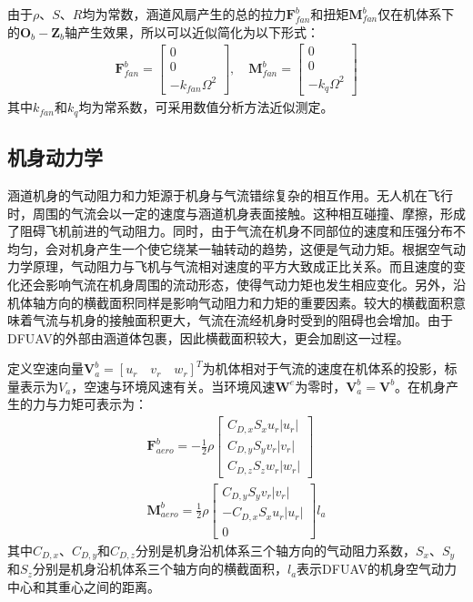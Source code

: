 由于$\rho$、$S$、$R$均为常数，涵道风扇产生的总的拉力$\boldsymbol{F}_{fan}^b$和扭矩$\boldsymbol{M}_{fan}^b$仅在机体系下的${\boldsymbol{O}_b}-{\boldsymbol{Z}_b}$轴产生效果，所以可以近似简化为以下形式\cite{choiStaticAnalysisSmall2012,manzoorCompositeObserverbasedRobust2023}：
\begin{align}
            \boldsymbol{F}_{fan}^b=\begin{bmatrix}0 \\ 0 \\
                -k_{fan}\Omega^2
            \end{bmatrix},\quad    
            \boldsymbol{M}_{fan}^b=\begin{bmatrix}0 \\ 0 \\
            -k_{q}\Omega^2
            \end{bmatrix}    \label{eq_22}
\end{align}
其中$k_{fan}$和$k_{q}$均为常系数，可采用数值分析方法近似测定。
\subsection{机身动力学}

涵道机身的气动阻力和力矩源于机身与气流错综复杂的相互作用。无人机在飞行时，周围的气流会以一定的速度与涵道机身表面接触。这种相互碰撞、摩擦，形成了阻碍飞机前进的气动阻力。同时，由于气流在机身不同部位的速度和压强分布不均匀，会对机身产生一个使它绕某一轴转动的趋势，这便是气动力矩。根据空气动力学原理，气动阻力与飞机与气流相对速度的平方大致成正比关系。而且速度的变化还会影响气流在机身周围的流动形态，使得气动力矩也发生相应变化。另外，沿机体轴方向的横截面积同样是影响气动阻力和力矩的重要因素。较大的横截面积意味着气流与机身的接触面积更大，气流在流经机身时受到的阻碍也会增加。由于DFUAV的外部由涵道体包裹，因此横截面积较大，更会加剧这一过程。

定义空速向量$\boldsymbol{V}_a^b= [ u_r \quad v_r \quad w_r ]^T$为机体相对于气流的速度在机体系的投影，标量表示为$V_a$，空速与环境风速有关。当环境风速$\boldsymbol{W}^e$为零时，$\boldsymbol{V}_a^b=\boldsymbol{V}^b$。在机身产生的力与力矩可表示为\cite{johnsonModelingControlFlight2006b,choiStaticAnalysisSmall2012}：
\begin{gather}
    \boldsymbol{F}_{aero}^b=-\frac{1}{2}\rho
    \begin{bmatrix}
    C_{D,x}S_xu_r|u_r| \\
    C_{D,y}S_yv_r|v_r| \\
    C_{D,z}S_zw_r|w_r|
    \end{bmatrix}\label{eq_22.5}\\
    \boldsymbol{M}_{aero}^b=\frac{1}{2}\rho
    \begin{bmatrix}
    C_{D,y}S_yv_r|v_r| \\
    -C_{D,x}S_xu_r|u_r| \\
    0
    \end{bmatrix}l_{a}
    \label{eq_23}
\end{gather}
其中$C_{D,x}$、$C_{D,y}$和$C_{D,z}$分别是机身沿机体系三个轴方向的气动阻力系数，$S_x$、$S_y$和$S_z$分别是机身沿机体系三个轴方向的横截面积，$l_{a}$表示DFUAV的机身空气动力中心和其重心之间的距离。

